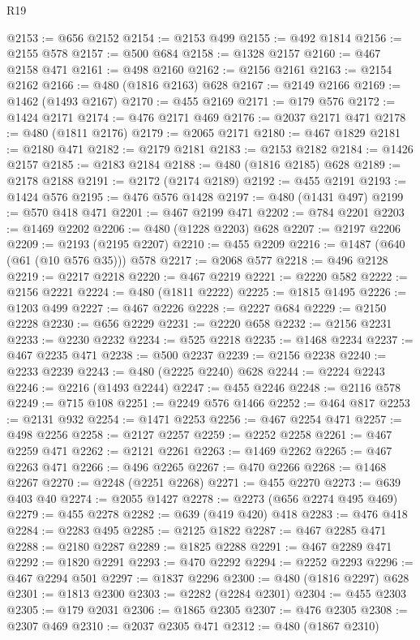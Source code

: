 \begin{lexlean}{R19}
\begin{coremodule}
@2153 := @656 @2152
@2154 := @2153 @499
@2155 := @492 @1814
@2156 := @2155 @578
@2157 := @500 @684
@2158 := @1328 @2157
@2160 := @467 @2158 @471
@2161 := @498 @2160
@2162 := @2156 @2161
@2163 := @2154 @2162
@2166 := @480 (@1816 @2163) @628
@2167 := @2149 @2166
@2169 := @1462 (@1493 @2167)
@2170 := @455 @2169
@2171 := @179 @576
@2172 := @1424 @2171
@2174 := @476 @2171 @469
@2176 := @2037 @2171 @471
@2178 := @480 (@1811 @2176)
@2179 := @2065 @2171
@2180 := @467 @1829
@2181 := @2180 @471
@2182 := @2179 @2181
@2183 := @2153 @2182
@2184 := @1426 @2157
@2185 := @2183 @2184
@2188 := @480 (@1816 @2185) @628
@2189 := @2178 @2188
@2191 := @2172 (@2174 @2189)
@2192 := @455 @2191
@2193 := @1424 @576
@2195 := @476 @576 @1428
@2197 := @480 (@1431 @497)
@2199 := @570 @418 @471
@2201 := @467 @2199 @471
@2202 := @784 @2201
@2203 := @1469 @2202
@2206 := @480 (@1228 @2203) @628
@2207 := @2197 @2206
@2209 := @2193 (@2195 @2207)
@2210 := @455 @2209
@2216 := @1487 (@640 (@61 (@10 @576 @35))) @578
@2217 := @2068 @577
@2218 := @496 @2128
@2219 := @2217 @2218
@2220 := @467 @2219
@2221 := @2220 @582
@2222 := @2156 @2221
@2224 := @480 (@1811 @2222)
@2225 := @1815 @1495
@2226 := @1203 @499
@2227 := @467 @2226
@2228 := @2227 @684
@2229 := @2150 @2228
@2230 := @656 @2229
@2231 := @2220 @658
@2232 := @2156 @2231
@2233 := @2230 @2232
@2234 := @525 @2218
@2235 := @1468 @2234
@2237 := @467 @2235 @471
@2238 := @500 @2237
@2239 := @2156 @2238
@2240 := @2233 @2239
@2243 := @480 (@2225 @2240) @628
@2244 := @2224 @2243
@2246 := @2216 (@1493 @2244)
@2247 := @455 @2246
@2248 := @2116 @578
@2249 := @715 @108
@2251 := @2249 @576 @1466
@2252 := @464 @817
@2253 := @2131 @932
@2254 := @1471 @2253
@2256 := @467 @2254 @471
@2257 := @498 @2256
@2258 := @2127 @2257
@2259 := @2252 @2258
@2261 := @467 @2259 @471
@2262 := @2121 @2261
@2263 := @1469 @2262
@2265 := @467 @2263 @471
@2266 := @496 @2265
@2267 := @470 @2266
@2268 := @1468 @2267
@2270 := @2248 (@2251 @2268)
@2271 := @455 @2270
@2273 := @639 @403 @40
@2274 := @2055 @1427
@2278 := @2273 (@656 @2274 @495 @469)
@2279 := @455 @2278
@2282 := @639 (@419 @420) @418
@2283 := @476 @418
@2284 := @2283 @495
@2285 := @2125 @1822
@2287 := @467 @2285 @471
@2288 := @2180 @2287
@2289 := @1825 @2288
@2291 := @467 @2289 @471
@2292 := @1820 @2291
@2293 := @470 @2292
@2294 := @2252 @2293
@2296 := @467 @2294 @501
@2297 := @1837 @2296
@2300 := @480 (@1816 @2297) @628
@2301 := @1813 @2300
@2303 := @2282 (@2284 @2301)
@2304 := @455 @2303
@2305 := @179 @2031
@2306 := @1865 @2305
@2307 := @476 @2305
@2308 := @2307 @469
@2310 := @2037 @2305 @471
@2312 := @480 (@1867 @2310)

\end{coremodule}
\end{lexlean}
